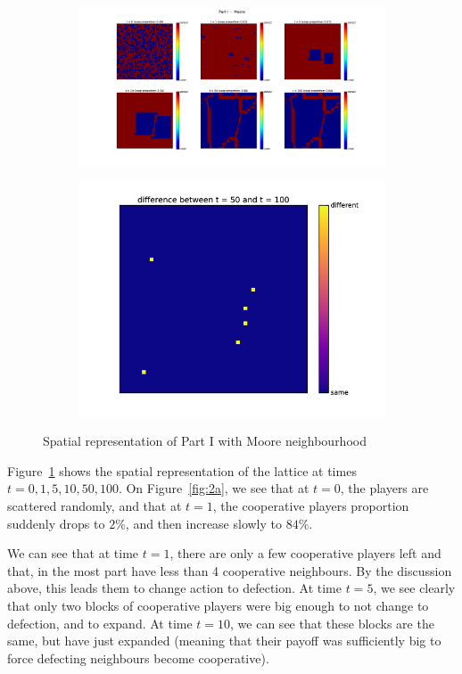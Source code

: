\documentclass{article}
\begin{document}
\begin{figure}[!b]
	\begin{subfigure}{\textwidth}
		\hspace{-2.5cm}
		\vspace{-.5cm}
		\includegraphics[width=1.25\textwidth]{imgs/part1_Moore_periods.png}
	\end{subfigure}
	\begin{subfigure}{\textwidth}
		\centering
		\includegraphics[width=.4\textwidth]{imgs/part1_Moore_periods_difference.png}
	\end{subfigure}
	\caption{Spatial representation of Part I with Moore neighbourhood\label{fig:Spatial Representation Part I Moore}}
\end{figure}

Figure~\ref{fig:Spatial Representation Part I Moore} shows the spatial representation of the lattice at
times $t = 0, 1, 5, 10, 50, 100$. On Figure~\ref{fig:2a}, we see that at $t=0$, the players are scattered
randomly, and that at $t=1$, the cooperative players proportion suddenly drops to $2\%$, and then
increase slowly to $84\%$.

We can see that at time $t=1$, there are only a few cooperative players left and that, in the most
part have less than 4 cooperative neighbours. By the discussion above, this leads them to change action
to defection. At time $t=5$, we see clearly that only two blocks of cooperative players were big enough
to not change to defection, and to expand. At time $t=10$, we can see that these blocks are the same,
but have just expanded (meaning that their payoff was sufficiently big to force defecting neighbours
become cooperative).
\end{document}
